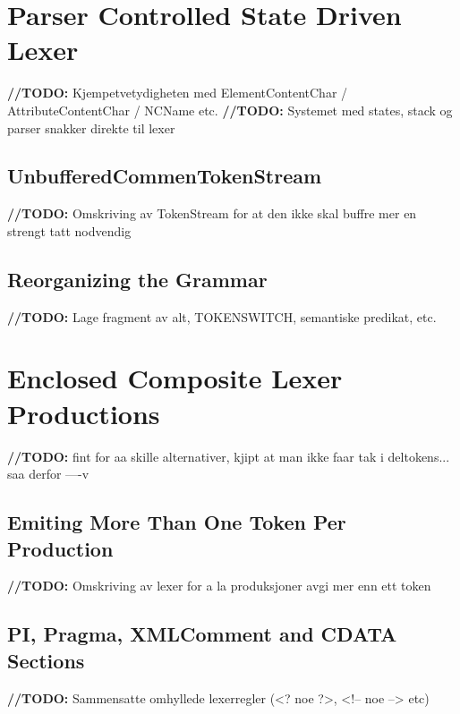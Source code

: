 \section{Parser Controlled State Driven Lexer}

\textbf{\LARGE //TODO:} Kjempetvetydigheten med ElementContentChar / AttributeContentChar / NCName etc.
\textbf{\LARGE //TODO:} Systemet med states, stack og parser snakker direkte til lexer

\subsection{UnbufferedCommenTokenStream}
\textbf{\LARGE //TODO:}  Omskriving av TokenStream for at den ikke skal buffre mer en strengt tatt nodvendig

\subsection{Reorganizing the Grammar}

\textbf{\LARGE //TODO:} Lage fragment av alt, TOKENSWITCH, semantiske predikat, etc.

\section{Enclosed Composite Lexer Productions}

\textbf{\LARGE //TODO:} fint for aa skille alternativer, kjipt at man ikke faar tak i deltokens... saa derfor ----v

\subsection{Emiting More Than One Token Per Production}
\textbf{\LARGE //TODO:} Omskriving av lexer for a la produksjoner avgi mer enn ett token

\subsection{PI, Pragma, XMLComment and CDATA Sections}
\textbf{\LARGE //TODO:} Sammensatte omhyllede lexerregler (<? noe ?>, <!-- noe --> etc)

